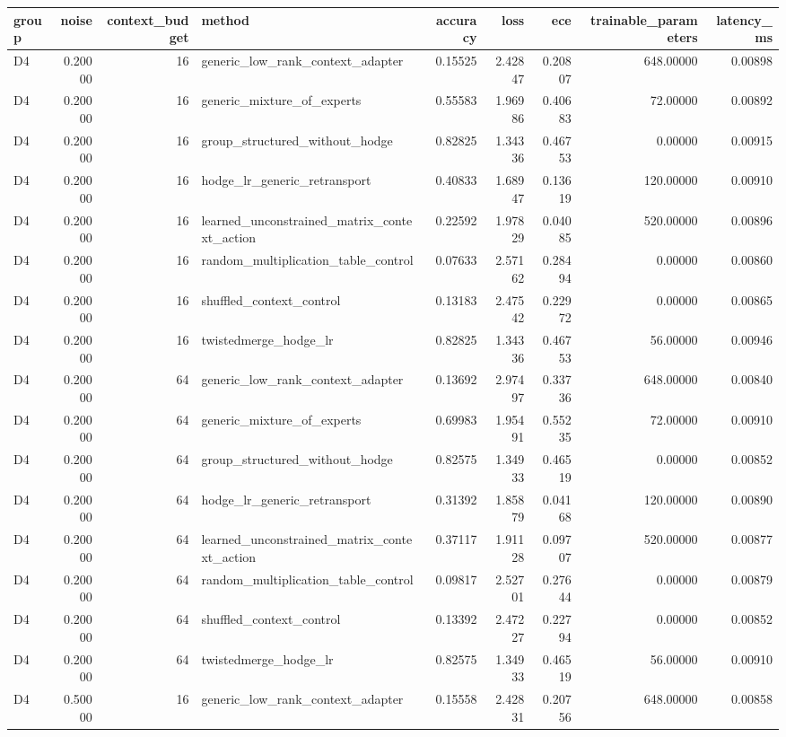 \begin{tabular}{lrrlrrrrr}
\toprule
group & noise & context_budget & method & accuracy & loss & ece & trainable_parameters & latency_ms \\
\midrule
D4 & 0.20000 & 16 & generic_low_rank_context_adapter & 0.15525 & 2.42847 & 0.20807 & 648.00000 & 0.00898 \\
D4 & 0.20000 & 16 & generic_mixture_of_experts & 0.55583 & 1.96986 & 0.40683 & 72.00000 & 0.00892 \\
D4 & 0.20000 & 16 & group_structured_without_hodge & 0.82825 & 1.34336 & 0.46753 & 0.00000 & 0.00915 \\
D4 & 0.20000 & 16 & hodge_lr_generic_retransport & 0.40833 & 1.68947 & 0.13619 & 120.00000 & 0.00910 \\
D4 & 0.20000 & 16 & learned_unconstrained_matrix_context_action & 0.22592 & 1.97829 & 0.04085 & 520.00000 & 0.00896 \\
D4 & 0.20000 & 16 & random_multiplication_table_control & 0.07633 & 2.57162 & 0.28494 & 0.00000 & 0.00860 \\
D4 & 0.20000 & 16 & shuffled_context_control & 0.13183 & 2.47542 & 0.22972 & 0.00000 & 0.00865 \\
D4 & 0.20000 & 16 & twistedmerge_hodge_lr & 0.82825 & 1.34336 & 0.46753 & 56.00000 & 0.00946 \\
D4 & 0.20000 & 64 & generic_low_rank_context_adapter & 0.13692 & 2.97497 & 0.33736 & 648.00000 & 0.00840 \\
D4 & 0.20000 & 64 & generic_mixture_of_experts & 0.69983 & 1.95491 & 0.55235 & 72.00000 & 0.00910 \\
D4 & 0.20000 & 64 & group_structured_without_hodge & 0.82575 & 1.34933 & 0.46519 & 0.00000 & 0.00852 \\
D4 & 0.20000 & 64 & hodge_lr_generic_retransport & 0.31392 & 1.85879 & 0.04168 & 120.00000 & 0.00890 \\
D4 & 0.20000 & 64 & learned_unconstrained_matrix_context_action & 0.37117 & 1.91128 & 0.09707 & 520.00000 & 0.00877 \\
D4 & 0.20000 & 64 & random_multiplication_table_control & 0.09817 & 2.52701 & 0.27644 & 0.00000 & 0.00879 \\
D4 & 0.20000 & 64 & shuffled_context_control & 0.13392 & 2.47227 & 0.22794 & 0.00000 & 0.00852 \\
D4 & 0.20000 & 64 & twistedmerge_hodge_lr & 0.82575 & 1.34933 & 0.46519 & 56.00000 & 0.00910 \\
D4 & 0.50000 & 16 & generic_low_rank_context_adapter & 0.15558 & 2.42831 & 0.20756 & 648.00000 & 0.00858 \\

\end{tabular}
